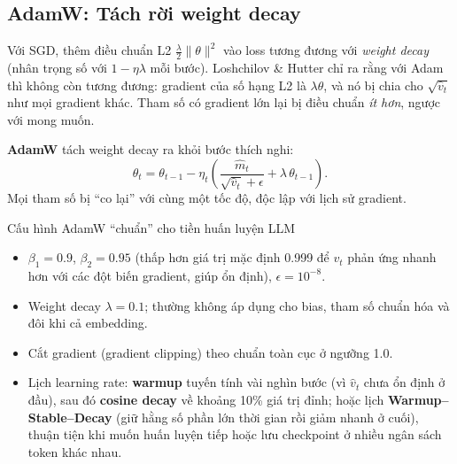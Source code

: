 \subsection{AdamW: Tách rời weight decay}
\label{ssec:adamw}
Với SGD, thêm điều chuẩn L2 $\frac{\lambda}{2}\|\theta\|^2$ vào loss tương đương với \emph{weight decay} (nhân trọng số với $1 - \eta\lambda$ mỗi bước). Loshchilov \& Hutter \cite{loshchilov2019adamw} chỉ ra rằng với Adam thì không còn tương đương: gradient của số hạng L2 là $\lambda\theta$, và nó bị chia cho $\sqrt{\hat{v}_t}$ như mọi gradient khác. Tham số có gradient lớn lại bị điều chuẩn \emph{ít hơn}, ngược với mong muốn.

\textbf{AdamW} tách weight decay ra khỏi bước thích nghi:
\begin{equation}
	\theta_t = \theta_{t-1} - \eta_t\left(\frac{\hat{m}_t}{\sqrt{\hat{v}_t} + \epsilon} + \lambda\,\theta_{t-1}\right).
\end{equation}
Mọi tham số bị “co lại” với cùng một tốc độ, độc lập với lịch sử gradient.

\begin{deepdive}{Cấu hình AdamW “chuẩn” cho tiền huấn luyện LLM}
\begin{itemize}
	\item $\beta_1 = 0.9$, $\beta_2 = 0.95$ (thấp hơn giá trị mặc định 0.999 để $v_t$ phản ứng nhanh hơn với các đột biến gradient, giúp ổn định), $\epsilon = 10^{-8}$.
	\item Weight decay $\lambda = 0.1$; thường không áp dụng cho bias, tham số chuẩn hóa và đôi khi cả embedding.
	\item Cắt gradient (gradient clipping) theo chuẩn toàn cục ở ngưỡng 1.0.
	\item Lịch learning rate: \textbf{warmup} tuyến tính vài nghìn bước (vì $\hat{v}_t$ chưa ổn định ở đầu), sau đó \textbf{cosine decay} về khoảng 10\% giá trị đỉnh; hoặc lịch \textbf{Warmup--Stable--Decay} (giữ hằng số phần lớn thời gian rồi giảm nhanh ở cuối), thuận tiện khi muốn huấn luyện tiếp hoặc lưu checkpoint ở nhiều ngân sách token khác nhau.
\end{itemize}
\end{deepdive}

